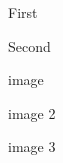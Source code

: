 \documentclass[letterpaper, 10 pt, conference]{../ieeeconf}  %
\title{\LARGE \bf
}
\begin{document}
\maketitle
\thispagestyle{empty}
\pagestyle{empty}



First \cite{2017arXiv170309039S}


Second \cite{DENG201849}

image \cite{2017arXiv170206392L}

image 2 \cite{Zhang:2016:ECI:2934583.2934644}

image 3 \cite{2016arXiv160305279R}



\printbibliography
\end{document}

